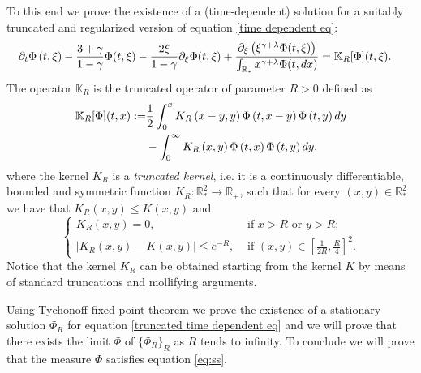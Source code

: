 \documentclass[11pt]{article}
\numberwithin{equation}{section}
\theoremstyle{plain}
\newcommand{\der}{\textup{d}}
\begin{document}
To this end we prove the existence of a (time-dependent) solution for a suitably  truncated and regularized version of equation \eqref{time dependent eq}:
\begin{align}
\label{truncated time dependent eq}
&\partial_{t} \Phi \left( t, \xi \right)- \frac{3+\gamma}{1-\gamma}\Phi(t, \xi) - \frac{2\xi}{1-\gamma} \partial_\xi \Phi(t, \xi) + \frac{\partial_\xi \left( \xi^{\gamma+\lambda} \Phi(t, \xi)\right)  }{\int_{\mathbb R_*} x^{\gamma+\lambda} \Phi(t, \der x ) } =\mathbb K_R [\Phi](t, \xi).
\end{align}
The operator $\mathbb K_R$ is the truncated operator of parameter $R>0$ defined as 
\begin{align} \label{truncated operator}
\mathbb K_R[\Phi](t,x):= &\frac{1}{2} \int_{0}^{x} K_R\left(  x-y,y\right)
\Phi\left( t, x-y\right)  \Phi\left( t, y\right)  \der y\nonumber\\
&-\int_{0}^{\infty}K_R\left(
x,y\right)  \Phi\left(t,  x\right)  \Phi \left(t,  y\right)  \der y, \end{align}
 where the kernel $K_R$ is a \textit{truncated kernel}, i.e. it is a continuously differentiable, bounded and symmetric function $K_R: \mathbb R_*^2 \rightarrow \mathbb R_+$, such that for every $(x,y ) \in \mathbb R_*^2 $ we have that $K_R(x,y) \leq K(x,y)$ and
 \begin{equation}\label{truncated kernel} 
 \begin{cases}
 K_R(x,y)=0, &\text{ if } x>R \text{ or } y > R; \\
  | K_R(x,y) - K(x,y) |\leq e^{-R}, &\text{ if } (x,y) \in \left[ \frac{1}{2 R}, \frac{R}{4}\right]^2.
 \end{cases} 
 \end{equation} 
Notice that the kernel $K_R$ can be obtained starting from the kernel $K$ by means of standard truncations and mollifying arguments.

Using Tychonoff fixed point theorem we prove the existence of a stationary solution $\Phi_{R} $ for equation \eqref{truncated time dependent eq} and we will prove that there exists the limit $\Phi$ of $\{ \Phi_{R} \}_{R}$ as $R$  tends to infinity. To conclude  we will prove that the measure $\Phi $ satisfies equation \eqref{eq:ss}. 
\end{document}
